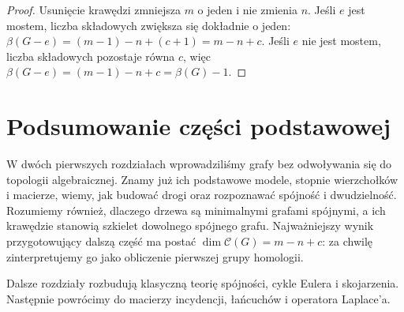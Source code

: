 \begin{proof}
Usunięcie krawędzi zmniejsza $m$ o jeden
i nie zmienia $n$. Jeśli $e$ jest mostem,
liczba składowych zwiększa się dokładnie
o jeden: $\beta(G-e)=(m-1)-n+(c+1)=m-n+c$.
Jeśli $e$ nie jest mostem, liczba
składowych pozostaje równa $c$, więc
$\beta(G-e)=(m-1)-n+c=\beta(G)-1$.
\end{proof}

\section*{Podsumowanie części podstawowej}

W dwóch pierwszych rozdziałach wprowadziliśmy grafy bez
odwoływania się do topologii algebraicznej. Znamy już ich
podstawowe modele, stopnie wierzchołków i macierze, wiemy,
jak budować drogi oraz rozpoznawać spójność i dwudzielność.
Rozumiemy również, dlaczego drzewa są minimalnymi grafami
spójnymi, a ich krawędzie stanowią szkielet dowolnego
spójnego grafu. Najważniejszy wynik przygotowujący dalszą
część ma postać $\dim\mathcal C(G)=m-n+c$: za chwilę
zinterpretujemy go jako obliczenie pierwszej grupy homologii.

Dalsze rozdziały rozbudują klasyczną teorię spójności,
cykle Eulera i skojarzenia. Następnie powrócimy do
macierzy incydencji, łańcuchów i operatora Laplace'a.


